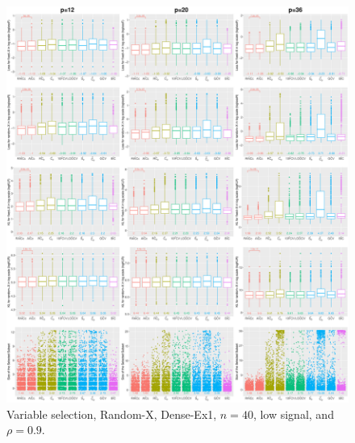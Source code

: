 \begin{figure}[!ht]
\centering
\includegraphics[width=\textwidth]{figures/supplement/randomx/subset_selection/Dense-Ex1_n40_lsnr_rho09.eps}
\caption{Variable selection, Random-X, Dense-Ex1, $n=40$, low signal, and $\rho=0.9$.}
\end{figure}
\clearpage
